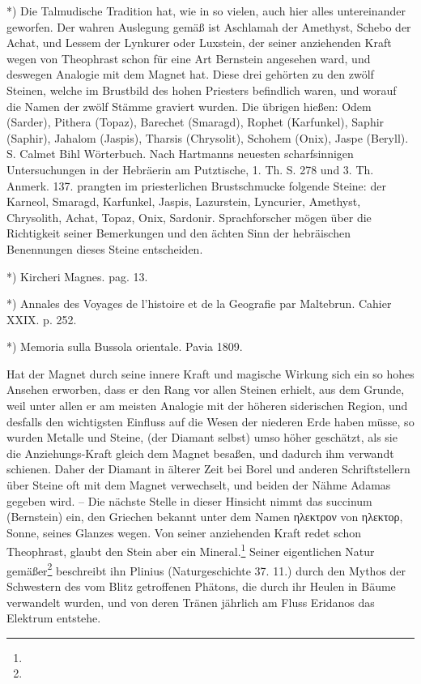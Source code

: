 \documentclass[a4paper, 11pt, oneside, polutonikogreek, german]{article}
\begin{document}
*) Die Talmudische Tradition hat, wie in so vielen, auch hier alles untereinander geworfen. Der wahren Auslegung gemäß ist Aschlamah der Amethyst, Schebo der Achat, und Lessem der Lynkurer oder Luxstein, der seiner anziehenden Kraft wegen von Theophrast schon für eine Art Bernstein angesehen ward, und deswegen Analogie mit dem Magnet hat. Diese drei gehörten zu den zwölf Steinen, welche im Brustbild des hohen Priesters befindlich waren, und worauf die Namen der zwölf Stämme graviert wurden. Die übrigen hießen: Odem (Sarder), Pithera (Topaz), Barechet (Smaragd), Rophet (Karfunkel), Saphir (Saphir), Jahalom (Jaspis), Tharsis (Chrysolit), Schohem (Onix), Jaspe (Beryll). S. Calmet Bihl Wörterbuch. Nach Hartmanns neuesten scharfsinnigen Untersuchungen in der Hebräerin am Putztische, 1. Th. S. 278 und 3. Th. Anmerk. 137. prangten im priesterlichen Brustschmucke folgende Steine: der Karneol, Smaragd, Karfunkel, Jaspis, Lazurstein, Lyncurier, Amethyst, Chrysolith, Achat, Topaz, Onix, Sardonir. Sprachforscher mögen über die Richtigkeit seiner Bemerkungen und den ächten Sinn der hebräischen Benennungen dieses Steine entscheiden.

*) Kircheri Magnes. pag. 13.

*) Annales des Voyages de l'histoire et de la Geografie par Maltebrun. Cahier XXIX. p. 252.

*) Memoria sulla Bussola orientale. Pavia 1809.

Hat der Magnet durch seine innere Kraft und magische Wirkung sich ein so hohes Ansehen erworben, dass er den Rang vor allen Steinen erhielt, aus dem Grunde, weil unter allen er am meisten Analogie mit der höheren siderischen Region, und desfalls den wichtigsten Einfluss auf die Wesen der niederen Erde haben müsse, so wurden Metalle und Steine, (der Diamant selbst) umso höher geschätzt, als sie die Anziehungs-Kraft gleich dem Magnet besaßen, und dadurch ihm verwandt schienen. Daher der Diamant in älterer Zeit bei Borel und anderen Schriftstellern über Steine oft mit dem Magnet verwechselt, und beiden der Nähme Adamas gegeben wird. -- Die nächste Stelle in dieser Hinsicht nimmt das succinum (Bernstein) ein, den Griechen bekannt unter dem Namen ηλεκτρον von ηλεκτορ, Sonne, seines Glanzes wegen. Von seiner anziehenden Kraft redet schon Theophrast, glaubt den Stein aber ein Mineral.\footnote{} Seiner eigentlichen Natur gemäßer\footnote{} beschreibt ihn Plinius (Naturgeschichte 37. 11.) durch den Mythos der Schwestern des vom Blitz getroffenen Phätons, die durch ihr Heulen in Bäume verwandelt wurden, und von deren Tränen jährlich am Fluss Eridanos das Elektrum entstehe.
\end{document}

